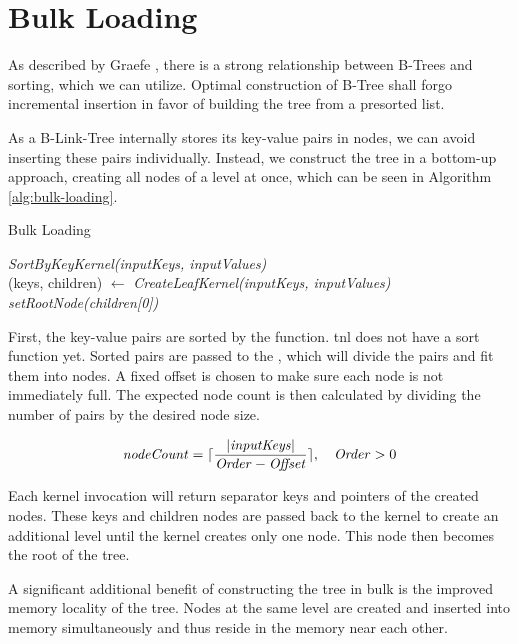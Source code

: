 \section{Bulk Loading}

As described by Graefe \cite{goetz-tech}, there is a strong relationship between B-Trees and sorting, which we can utilize. Optimal construction of B-Tree shall forgo incremental insertion in favor of building the tree from a presorted list.

As a B-Link-Tree internally stores its key-value pairs in nodes, we can avoid inserting these pairs individually. Instead, we construct the tree in a bottom-up approach, creating all nodes of a level at once, which can be seen in Algorithm \ref{alg:bulk-loading}.

\begin{algorithm}[H]
  \caption{Bulk Loading}\label{alg:bulk-loading}

  \textit{SortByKeyKernel(inputKeys, inputValues)}\\

  (keys, children) $\gets$ \textit{CreateLeafKernel(inputKeys, inputValues)}\\
  \textit{setRootNode(children[0])}
\end{algorithm}

First, the key-value pairs are sorted by the  function. \acrshort{tnl} does not have a sort function yet. Sorted pairs are passed to the , which will divide the pairs and fit them into nodes. A fixed offset is chosen to make sure each node is not immediately full. 
The expected node count is then calculated by dividing the number of pairs by the desired node size.  

$$\mathit{nodeCount} = \lceil\frac{|\mathit{inputKeys}|}{\mathit{Order} - \mathit{Offset}}\rceil,\quad \begin{aligned} \mathit{Order} > 0\end{aligned}$$

Each kernel invocation will return separator keys and pointers of the created nodes. These keys and children nodes are passed back to the kernel to create an additional level until the kernel creates only one node. This node then becomes the root of the tree.

A significant additional benefit of constructing the tree in bulk is the improved memory locality of the tree. Nodes at the same level are created and inserted into memory simultaneously and thus reside in the memory near each other.



